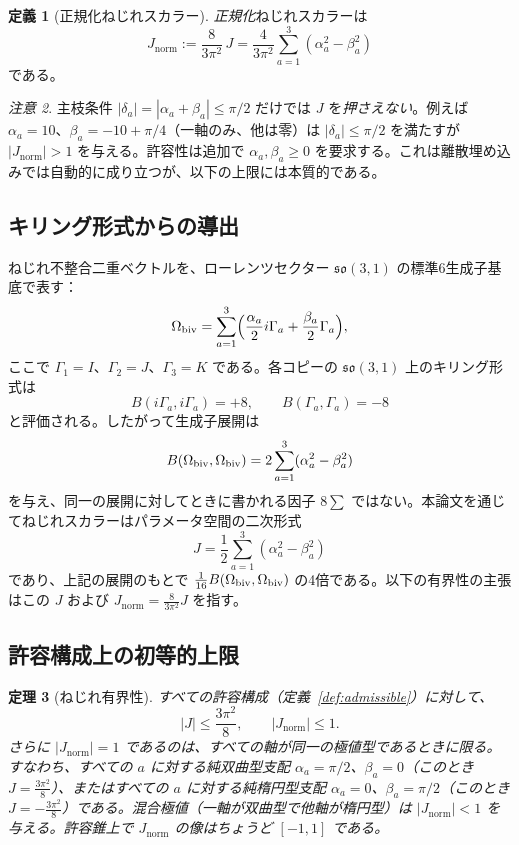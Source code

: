 \documentclass[a4paper]{article}
\newtheorem{theorem}{定理}[section]
\theoremstyle{definition}
\newtheorem{definition}[theorem]{定義}
\theoremstyle{remark}
\newtheorem{remark}[theorem]{注意}
\newcommand{\Jnorm}{J_{\mathrm{norm}}}
\newcommand{\Jbound}{\frac{3\pi^2}{8}}
\begin{document}
\begin{definition}[正規化ねじれスカラー]
\label{def:Jnorm}
\emph{正規化}ねじれスカラーは
\[
\Jnorm := \frac{8}{3\pi^2}\,J
= \frac{4}{3\pi^2}\sum_{a=1}^3 (\alpha_a^2 - \beta_a^2)
\]
である。
\end{definition}

\begin{remark}
主枝条件 \(|\delta_a| = |\alpha_a + \beta_a| \leq \pi/2\) だけでは \(J\) を\emph{押さえない}。例えば \(\alpha_a = 10\)、\(\beta_a = -10 + \pi/4\)（一軸のみ、他は零）は \(|\delta_a| \leq \pi/2\) を満たすが \(|\Jnorm| > 1\) を与える。許容性は追加で \(\alpha_a,\beta_a \geq 0\) を要求する。これは離散埋め込みでは自動的に成り立つが、以下の上限には本質的である。
\end{remark}

\subsection{キリング形式からの導出}

ねじれ不整合二重ベクトルを、ローレンツセクター \( \mathfrak{so}(3,1) \) の標準6生成子基底で表す：
\[
\Omega_{\rm biv} = \sum_{a=1}^3 \Bigl( \frac{\alpha_a}{2} i\Gamma_a + \frac{\beta_a}{2} \Gamma_a \Bigr),
\]
ここで \( \Gamma_1 = I \)、\( \Gamma_2 = J \)、\( \Gamma_3 = K \) である。各コピーの \(\mathfrak{so}(3,1)\) 上のキリング形式は
\[
B(i\Gamma_a, i\Gamma_a) = +8, \qquad B(\Gamma_a, \Gamma_a) = -8
\]
と評価される。したがって生成子展開は
\[
B(\Omega_{\rm biv}, \Omega_{\rm biv}) = 2 \sum_{a=1}^3 (\alpha_a^2 - \beta_a^2)
\]
を与え、同一の展開に対してときに書かれる因子 \(8\sum\) ではない。本論文を通じてねじれスカラーはパラメータ空間の二次形式
\[
J = \frac12 \sum_{a=1}^3 (\alpha_a^2 - \beta_a^2)
\]
であり、上記の展開のもとで \(\frac1{16}B(\Omega_{\rm biv},\Omega_{\rm biv})\) の4倍である。以下の有界性の主張はこの \(J\) および \(\Jnorm=\frac8{3\pi^2}J\) を指す。

\subsection{許容構成上の初等的上限}

\begin{theorem}[ねじれ有界性]
\label{thm:torsion-bound}
すべての許容構成（定義~\ref{def:admissible}）に対して、
\[
|J| \leq \Jbound, \qquad |\Jnorm| \leq 1.
\]
さらに \(|\Jnorm| = 1\) であるのは、すべての軸が同一の極値型であるときに限る。すなわち、すべての \(a\) に対する純双曲型支配 \(\alpha_a = \pi/2\)、\(\beta_a = 0\)（このとき \(J = \Jbound\)）、またはすべての \(a\) に対する純楕円型支配 \(\alpha_a = 0\)、\(\beta_a = \pi/2\)（このとき \(J = -\Jbound\)）である。混合極値（一軸が双曲型で他軸が楕円型）は \(|\Jnorm| < 1\) を与える。許容錐上で \(\Jnorm\) の像はちょうど \([-1,1]\) である。
\end{theorem}
\end{document}
